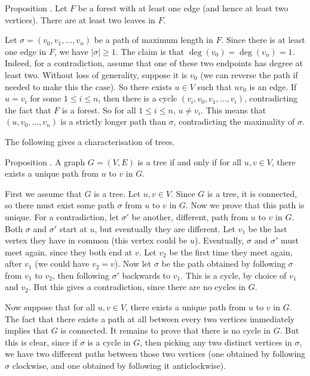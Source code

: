 \edef\proptwoleaves{\the\thmcount}
\proclaim Proposition \advthm. Let $F$ be a forest with at least one edge (and hence at least
two vertices). There are at least two leaves in $F$.

\proof Let $\sigma = (v_0,v_1,\ldots,v_n)$ be a path of maximum length in $F$.
Since there is at least one edge in $F$, we have $|\sigma|\ge 1$. The claim is that
$\deg(v_0) = \deg(v_n) = 1$. Indeed, for a contradiction, assume that one of these
two endpoints has degree at least two. Without loss of generality, suppose it is
$v_0$ (we can reverse the path if needed to make this the case). So there exists
$u\in V$ such that $uv_0$ is an edge. If $u = v_i$ for some $1\le i\le n$, then
there is a cycle $(v_i, v_0, v_1,\ldots, v_i)$, contradicting the fact that $F$ is a forest.
So for all $1\le i\le n$, $u\ne v_i$. This means that
$(u,v_0, \ldots, v_n)$ is a strictly longer path than $\sigma$, contradicting the maximality
of $\sigma$.\slug

The following gives a characterisation of trees.

\proclaim Proposition \advthm. A graph $G = (V,E)$ is a tree if and only if
for all $u,v\in V$, there exists a unique path from $u$ to $v$ in $G$.

\proof First we assume that $G$ is a tree. Let $u,v\in V$. Since $G$ is a tree,
it is connected, so there must exist some path $\sigma$ from $u$ to $v$ in $G$.
Now we prove that this path is unique. For a contradiction, let $\sigma'$
be another, different, path from $u$ to $v$ in $G$. Both $\sigma$ and $\sigma'$
start at $u$, but eventually they are different. Let $v_1$ be the last vertex they have
in common (this vertex could be $u$).
Eventually, $\sigma$ and $\sigma'$ must meet again, since they both
end at $v$. Let $v_2$ be the first time they meet again, after $v_1$ (we could have $v_2 = v$). Now
let $\sigma$ be the path obtained by following $\sigma$ from $v_1$ to $v_2$, then
following $\sigma'$ backwards to $v_1$. This is a cycle, by choice of $v_1$ and $v_2$.
But this gives a contradiction, since there are no cycles in $G$.

Now suppose that for all $u,v\in V$, there exists a unique path from $u$ to $v$ in $G$.
The fact that there exists a path at all between every two vertices immediately implies
that $G$ is connected. It remains to prove that there is no cycle in $G$. But this
is clear, since if $\sigma$ is a cycle in $G$, then picking any two distinct vertices in $\sigma$,
we have two different paths between those two vertices (one obtained by following $\sigma$
clockwise, and one obtained by following it anticlockwise).\slug

